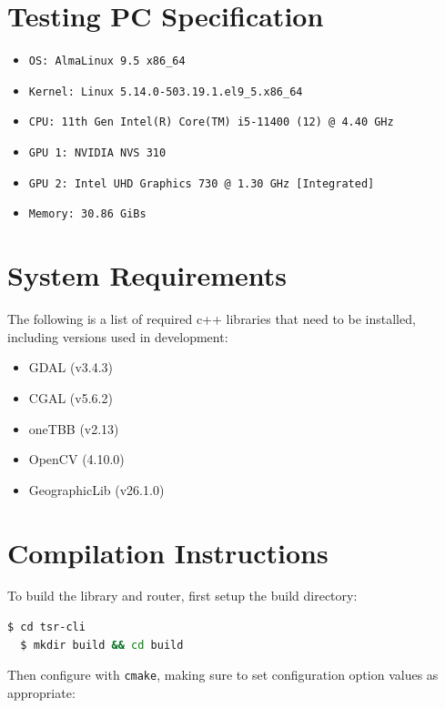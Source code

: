 \documentclass[12pt]{article}
\begin{document}
\pagebreak
\begin{appendices}

  \section{Testing PC Specification}\label{appendix:specs}

  \begin{itemize}
    \item \texttt{OS: AlmaLinux 9.5 x86\_64} %
    \item \texttt{Kernel: Linux 5.14.0-503.19.1.el9\_5.x86\_64}
    \item \texttt{CPU: 11th Gen Intel(R) Core(TM) i5-11400 (12) @ 4.40 GHz}
    \item \texttt{GPU 1: NVIDIA NVS 310}
    \item \texttt{GPU 2: Intel UHD Graphics 730 @ 1.30 GHz [Integrated]}
    \item \texttt{Memory: 30.86 GiBs}
  \end{itemize}

  \section{System Requirements}

  The following is a list of required c++ libraries that need to be installed, including versions used in development:

  \begin{itemize}
    \item GDAL (v3.4.3)
    \item CGAL (v5.6.2)
    \item oneTBB (v2.13)
    \item OpenCV (4.10.0)
    \item GeographicLib (v26.1.0)
  \end{itemize}

  \section{Compilation Instructions}

  To build the library and router, first setup the build directory:

  \begin{lstlisting}[language=bash]
  $ cd tsr-cli
  $ mkdir build && cd build
\end{lstlisting}

  \noindent Then configure with \texttt{cmake}, making sure to set configuration option values as appropriate:


\end{appendices}
\end{document}
